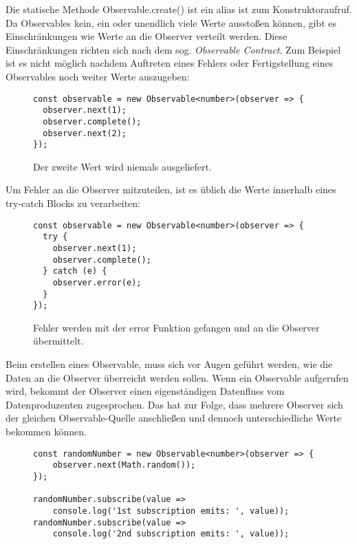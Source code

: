 \noindent
Die statische Methode Observable.create() ist ein alias ist zum Konstruktoraufruf. Da Observables kein, ein oder unendlich viele Werte ausstoßen können, gibt es Einschränkungen wie Werte an die Observer verteilt werden. Diese Einschränkungen richten sich nach dem sog. \textit{Observable Contract}. Zum Beispiel ist es nicht möglich nachdem Auftreten eines Fehlers oder Fertigstellung eines Observables noch weiter Werte auszugeben:

\begin{figure}[H]
\begin{lstlisting}[basicstyle=\small]
const observable = new Observable<number>(observer => {
  observer.next(1);
  observer.complete();
  observer.next(2);
});
\end{lstlisting}
\caption{Der zweite Wert wird niemals ausgeliefert.}
\end{figure}

\noindent
Um Fehler an die Observer mitzuteilen, ist es üblich die Werte innerhalb eines try-catch Blocks zu verarbeiten:

\begin{figure}[H]
\begin{lstlisting}[basicstyle=\small]
const observable = new Observable<number>(observer => {
  try {
    observer.next(1);
    observer.complete();
  } catch (e) {
    observer.error(e);
  }
});
\end{lstlisting}
\caption{Fehler werden mit der error Funktion gefangen und an die Observer übermittelt.}
\label{catch-error-obs}
\end{figure}

\noindent
Beim erstellen eines Observable, muss sich vor Augen geführt werden, wie die Daten an die Observer überreicht werden sollen. Wenn ein Observable aufgerufen wird, bekommt der Observer einen eigenständigen Datenfluss vom Datenproduzenten zugesprochen. Das hat zur Folge, dass mehrere Observer sich der gleichen Observable-Quelle anschließen und dennoch unterschiedliche Werte bekommen können.

\begin{figure}[H]
\begin{lstlisting}[basicstyle=\small]
const randomNumber = new Observable<number>(observer => {
    observer.next(Math.random());
});

randomNumber.subscribe(value =>
    console.log('1st subscription emits: ', value));
randomNumber.subscribe(value =>
    console.log('2nd subscription emits: ', value));
\end{lstlisting}
\end{figure}

